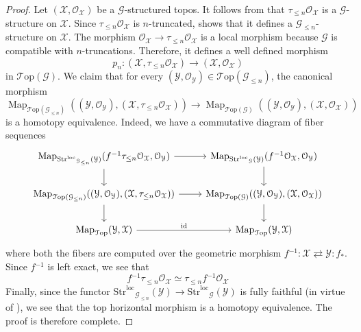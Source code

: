 \documentclass[12pt,a4paper,reqno]{amsart}
\theoremstyle{plain}
\theoremstyle{definition}
\theoremstyle{remark}
\numberwithin{equation}{section}
\begin{document}
\begin{proof}
	Let $({\mathcal X}, {\mathcal O}_{\mathcal X})$ be a ${\mathcal G}$-structured topos.
	It follows from \cite[Proposition 3.3.3]{DAG-V} that $\tau_{\le n} {\mathcal O}_{\mathcal X}$ is a ${\mathcal G}$-structure on ${\mathcal X}$.
	Since $\tau_{\le n} {\mathcal O}_{\mathcal X}$ is $n$-truncated, \cite[Proposition 1.5.14]{DAG-V} shows that it defines a ${\mathcal G}_{\le n}$-structure on ${\mathcal X}$.
	The morphism ${\mathcal O}_{\mathcal X} \to \tau_{\le n} {\mathcal O}_{\mathcal X}$ is a local morphism because ${\mathcal G}$ is compatible with $n$-truncations.
	Therefore, it defines a well defined morphism
	\[ p_n \colon ({\mathcal X}, \tau_{\le n} {\mathcal O}_{\mathcal X}) \to ({\mathcal X}, {\mathcal O}_{\mathcal X}) \]
	in ${\mathcal T\mathrm{op}}({\mathcal G})$.
	We claim that for every $({\mathcal Y}, {\mathcal O}_{\mathcal Y}) \in {\mathcal T\mathrm{op}}({\mathcal G}_{\le n})$, the canonical morphism
	\[ \operatorname{Map}_{{\mathcal T\mathrm{op}}({\mathcal G}_{\le n})}(({\mathcal Y}, {\mathcal O}_{\mathcal Y}), ({\mathcal X}, \tau_{\le n} {\mathcal O}_{\mathcal X})) \to \operatorname{Map}_{{\mathcal T\mathrm{op}}({\mathcal G})}(({\mathcal Y}, {\mathcal O}_{\mathcal Y}), ({\mathcal X}, {\mathcal O}_{\mathcal X})) \]
	is a homotopy equivalence.
	Indeed, we have a commutative diagram of fiber sequences
	\[ \begin{tikzcd}
	\operatorname{Map}_{{\mathrm{Str}^\mathrm{loc}}_{{\mathcal G}_{\le n}}({\mathcal Y})}(f{^{-1}} \tau_{\le n} {\mathcal O}_{\mathcal X}, {\mathcal O}_{\mathcal Y}) \arrow{r} \arrow{d} & \operatorname{Map}_{{\mathrm{Str}^\mathrm{loc}}_{\mathcal G}({\mathcal Y})}(f{^{-1}} {\mathcal O}_{\mathcal X}, {\mathcal O}_{\mathcal Y} ) \arrow{d} \\
	\operatorname{Map}_{{\mathcal T\mathrm{op}}({\mathcal G}_{\le n})}(({\mathcal Y}, {\mathcal O}_{\mathcal Y}), ({\mathcal X}, \tau_{\le n} {\mathcal O}_{\mathcal X})) \arrow{r} \arrow{d} & \operatorname{Map}_{{\mathcal T\mathrm{op}}({\mathcal G})}(({\mathcal Y}, {\mathcal O}_{\mathcal Y}), ({\mathcal X}, {\mathcal O}_{\mathcal X})) \arrow{d} \\
	\operatorname{Map}_{\mathcal T\mathrm{op}}({\mathcal Y}, {\mathcal X}) \arrow{r}{\mathrm{id}} & \operatorname{Map}_{\mathcal T\mathrm{op}}({\mathcal Y}, {\mathcal X})
	\end{tikzcd} \]
	where both the fibers are computed over the geometric morphism $f{^{-1}} \colon {\mathcal X} \rightleftarrows {\mathcal Y} \colon f_*$.
	Since $f{^{-1}}$ is left exact, we see that
	\[ f{^{-1}} \tau_{\le n} {\mathcal O}_{\mathcal X} \simeq \tau_{\le n} f{^{-1}} {\mathcal O}_{\mathcal X} \]
	Finally, since the functor ${\mathrm{Str}^\mathrm{loc}}_{{\mathcal G}_{\le n}}({\mathcal Y}) \to {\mathrm{Str}^\mathrm{loc}}_{\mathcal G}({\mathcal Y})$ is fully faithful (in virtue of \cite[Proposition 1.5.14]{DAG-V}), we see that the top horizontal morphism is a homotopy equivalence.
	The proof is therefore complete.
\end{proof}
\end{document}
